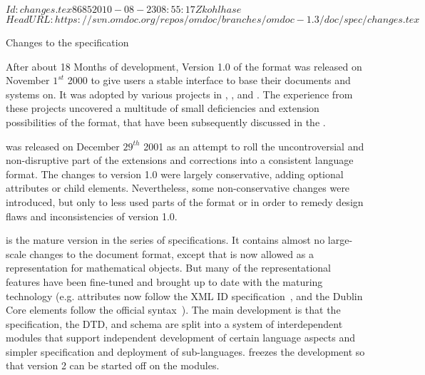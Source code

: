 \svnInfo $Id: changes.tex 8685 2010-08-23 08:55:17Z kohlhase $
\svnKeyword $HeadURL: https://svn.omdoc.org/repos/omdoc/branches/omdoc-1.3/doc/spec/changes.tex $

\begin{tchapter}[id=changelog]{Changes to the specification}

After about 18 Months of development, Version 1.0 of the {\omdoc} format was released on
November $1^{st}$ 2000 to give users a stable interface to base their documents and
systems on. It was adopted by various projects in {},
{}, and {}. The
experience from these projects uncovered a multitude of small deficiencies and extension
possibilities of the format, that have been subsequently discussed in the {\omdoc}
{}.

{} was released on December $29^{th}$ 2001 as an attempt to roll the
uncontroversial and non-disruptive part of the extensions and corrections into a
consistent language format. The changes to version 1.0 were largely conservative,
adding optional attributes or child elements. Nevertheless, some non-conservative
changes were introduced, but only to less used parts of the format or in order to
remedy design flaws and inconsistencies of version 1.0.

{} is the mature version in the {} series of specifications. It
contains almost no large-scale changes to the document format, except that {\cmathml} is
now allowed as a representation for mathematical objects. But many of the representational
features have been fine-tuned and brought up to date with the maturing {\xml} technology
(e.g. {} attributes now follow the XML ID
specification~\cite{XML:id05}, and the Dublin Core elements follow the official
syntax~\cite{DCMI:dmt03}). The main development is that the {\omdoc} specification, the
DTD, and schema are split into a system of interdependent modules that support independent
development of certain language aspects and simpler specification and deployment of
sub-languages.  {} freezes the development so that version 2 can be started
off on the modules.


\end{tchapter}
